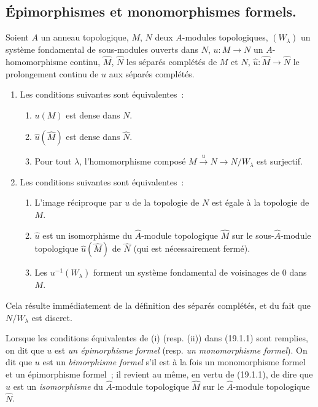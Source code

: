 \subsection{Épimorphismes et monomorphismes formels.}
\label{subsection:0.19.1-fr}

\begin{proposition}[19.1.1]
\label{0.19.1.1-fr}
Soient $A$ un anneau topologique, $M$, $N$ deux $A$-modules topologiques,
$(W_\lambda)$ un système fondamental de sous-modules ouverts dans $N$,
$u:M\to N$ un $A$-homomorphisme continu, $\widehat M$, $\widehat N$ les
séparés complétés de $M$ et $N$, $\widehat u:\widehat M\to\widehat N$ le
prolongement continu de $u$ aux séparés complétés.
\begin{enumerate}
  \item[\textup{(i)}] Les conditions suivantes sont équivalentes~:
  \begin{enumerate}
    \item[\textup{a)}] $u(M)$ est dense dans $N$.
    \item[\textup{a$'$)}] $\widehat u(\widehat M)$ est dense dans $\widehat N$.
    \item[\textup{a$''$)}] Pour tout $\lambda$, l'homomorphisme composé
    $M\xrightarrow{u}N\to N/W_\lambda$ est surjectif.
  \end{enumerate}
  \item[\textup{(ii)}] Les conditions suivantes sont équivalentes~:
  \begin{enumerate}
    \item[\textup{b)}] L'image réciproque par $u$ de la topologie de $N$ est égale à la
    topologie de $M$.
    \item[\textup{b$'$)}] $\widehat u$ est un isomorphisme du $\widehat A$-module
    topologique $\widehat M$ sur le sous-$\widehat A$-module topologique
    $\widehat u(\widehat M)$ de $\widehat N$ (qui est nécessairement
    fermé).
    \item[\textup{b$''$)}] Les $u^{-1}(W_\lambda)$ forment un système fondamental de
    voisinages de 0 dans $M$.
  \end{enumerate}
\end{enumerate}
\end{proposition}

Cela résulte immédiatement de la définition des séparés complétés, et du fait
que $N/W_\lambda$ est discret.

\begin{env}[19.1.2]
\label{0.19.1.2-fr}
Lorsque les conditions équivalentes de (i) (resp. (ii)) dans (19.1.1) sont
remplies, on dit que $u$ est \emph{un épimorphisme formel} (resp. \emph{un
monomorphisme formel}). On dit que $u$ est un \emph{bimorphisme formel}
s'il est à la fois un monomorphisme formel et un épimorphisme formel~; il
revient au même, en vertu de (19.1.1), de dire que $\widehat u$ est un
\emph{isomorphisme} du $\widehat A$-module topologique $\widehat M$ sur le
$\widehat A$-module topologique $\widehat N$.
\end{env}

